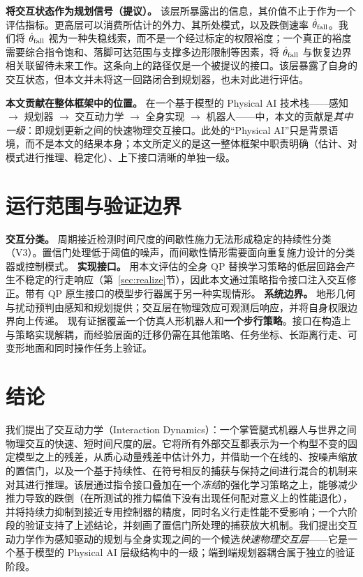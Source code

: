 \documentclass[journal]{IEEEtran}
\begin{document}
\textbf{将交互状态作为规划信号（提议）。} 该层所暴露出的信息，其价值不止于作为一个评估指标。更高层可以消费所估计的外力、其所处模式，以及跌倒速率 $\dot\theta_{\rm fall}$。我们将 $\dot\theta_{\rm fall}$ 视为一种失稳线索，而不是一个经过标定的权限裕度；一个真正的裕度需要综合指令饱和、落脚可达范围与支撑多边形限制等因素，将 $\dot\theta_{\rm fall}$ 与恢复边界相关联留待未来工作。这条向上的路径仅是一个被提议的接口。该层暴露了自身的交互状态，但本文并未将这一回路闭合到规划器，也未对此进行评估。

\textbf{本文贡献在整体框架中的位置。} 在一个基于模型的 Physical AI 技术栈——感知 $\rightarrow$ 规划器 $\rightarrow$ 交互动力学 $\rightarrow$ 全身实现 $\rightarrow$ 机器人——中，本文的贡献是\emph{其中一级}：即规划更新之间的快速物理交互接口。此处的“Physical AI”只是背景语境，而不是本文的结果本身；本文所定义的是这一整体框架中职责明确（估计、对模式进行推理、稳定化）、上下接口清晰的单独一级。

\section{运行范围与验证边界}
\label{sec:limits}

\textbf{交互分类。} 周期接近检测时间尺度的间歇性施力无法形成稳定的持续性分类（V3）。置信门处理低于阈值的噪声，而间歇性情形需要面向重复施力设计的分类器或控制模式。
\textbf{实现接口。} 用本文评估的全身 QP 替换学习策略的低层回路会产生不稳定的行走响应（第~\ref{sec:realize}节），因此本文通过策略指令接口注入交互修正。带有 QP 原生接口的模型步行器属于另一种实现情形。
\textbf{系统边界。} 地形几何与扰动预判由感知和规划提供；交互层在物理效应可观测后响应，并将自身权限边界向上传递。
现有证据覆盖一个仿真人形机器人和\textbf{一个步行策略}。接口在构造上与策略实现解耦，而经验层面的迁移仍需在其他策略、任务坐标、长距离行走、可变形地面和同时操作任务上验证。

\section{结论}
\label{sec:conclusion}

我们提出了交互动力学（Interaction Dynamics）：一个掌管腿式机器人与世界之间物理交互的快速、短时间尺度的层。它将所有外部交互都表示为一个构型不变的固定模型之上的残差，从质心动量残差中估计外力，并借助一个在线的、按噪声缩放的置信门，以及一个基于持续性、在符号相反的捕获与保持之间进行混合的机制来对其进行推理。该层通过指令接口叠加在一个\emph{冻结}的强化学习策略之上，能够减少推力导致的跌倒（在所测试的推力幅值下没有出现任何配对意义上的性能退化），并将持续力抑制到接近专用控制器的精度，同时名义行走性能不受影响；一个六阶段的验证支持了上述结论，并刻画了置信门所处理的捕获放大机制。我们提出交互动力学作为感知驱动的规划与全身实现之间的一个候选\emph{快速物理交互层}——它是一个基于模型的 Physical AI 层级结构中的一级；端到端规划器耦合属于独立的验证阶段。
\end{document}
